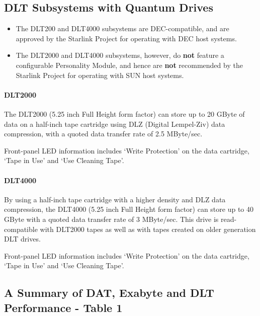 \subsection {DLT Subsystems with Quantum Drives}

\begin {itemize}

\item[{\Large\bf +}] The DLT200 and DLT4000 subsystems are DEC-compatible, and
are approved by the Starlink Project for operating with DEC host systems.

\item[{\huge\bf -}] The DLT2000 and DLT4000 subsystems, however, do {\bf not}
feature a configurable Personality Module, and hence are {\bf not} recommended
by the Starlink Project for operating with SUN host systems.

\end {itemize}

\paragraph {DLT2000}

The DLT2000 (5.25 inch Full Height form factor) can store up to 20 GByte of
data on a half-inch tape cartridge using DLZ (Digital Lempel-Ziv) data
compression, with a quoted data transfer rate of 2.5 MByte/sec.

Front-panel LED information includes `Write Protection' on the data cartridge,
`Tape in Use' and `Use Cleaning Tape'.

\paragraph {DLT4000}

By using a half-inch tape cartridge with a higher density and DLZ data
compression, the DLT4000 (5.25 inch Full Height form factor) can store up to
40 GByte with a quoted data transfer rate of 3 MByte/sec. This drive is
read-compatible with DLT2000 tapes as well as with tapes created on older
generation DLT drives.

Front-panel LED information includes `Write Protection' on the data cartridge,
`Tape in Use' and `Use Cleaning Tape'.

\subsection {A Summary of DAT, Exabyte and DLT Performance - Table 1}

